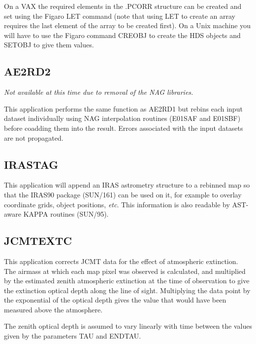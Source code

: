 \documentclass[twoside,11pt]{article}
\newcommand{\xref}[3]{#1}
\newcommand{\xlabel}[1]{}
\renewcommand{\_}{\texttt{\symbol{95}}}
\begin{document}
On a VAX the required elements in the .PCORR structure can be created and
set using the Figaro LET command (note that using LET to create an array 
requires the last element of the array to be created first). On a Unix machine
you will have to use the Figaro command CREOBJ to create the HDS objects and
SETOBJ to give them values.


\goodbreak

\subsection{\xlabel{AE2RD2}AE2RD2}

\textit{Not available at this time due to removal of the NAG libraries.}

This application performs the same function as AE2RD1 but rebins each
input dataset individually using NAG interpolation routines (E01SAF
and E01SBF) before coadding them into the result. Errors associated
with the input datasets are not propagated.


\goodbreak

\subsection{\xlabel{IRAS_TAG}IRAS\_TAG}

This application will append an IRAS astrometry structure to a 
rebinned map so that the IRAS90 package
(\xref{SUN/161}{sun161}{}) can be used on it,
for example to overlay coordinate grids, object positions, {\em etc}.
This information is also readable by AST-aware KAPPA routines (\xref{SUN/95}{sun95}{}).

\goodbreak

\subsection{\xlabel{JCMTEXTC}JCMTEXTC}

This application corrects JCMT data for the effect of  atmospheric
extinction. The airmass at which each map pixel was  observed is
calculated, and multiplied by the estimated zenith  atmospheric
extinction at the time of observation to give the  extinction optical
depth along the line of sight. Multiplying the data point by the
exponential of the optical depth gives  the value that would have been
measured above the atmosphere. 

The zenith optical depth is assumed to vary linearly with  time
between the values given by the parameters TAU and ENDTAU.
\end{document}
